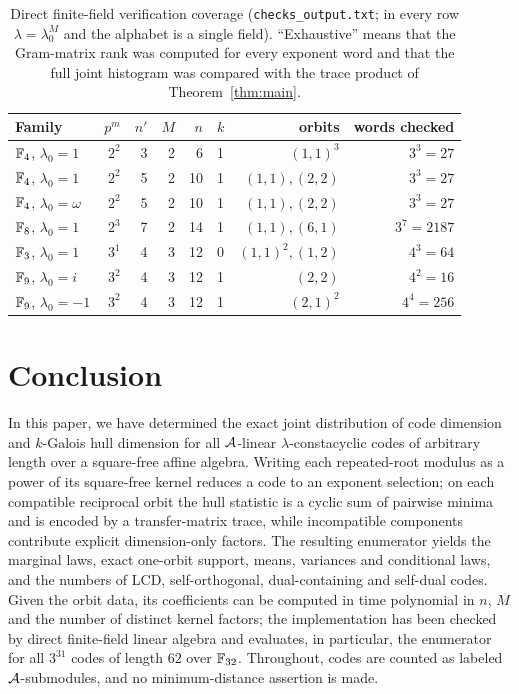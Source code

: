 \begin{table}[!t]
\centering
\scriptsize
\setlength{\tabcolsep}{2.5pt}
\caption{Direct finite-field verification coverage
(\texttt{checks\_output.txt}; in every row $\lambda=\lambda_0^M$ and the
alphabet is a single field).  ``Exhaustive'' means that the Gram-matrix rank
was computed for every exponent word and that the full joint histogram was
compared with the trace product of Theorem~\ref{thm:main}.}
\label{tab:verification}
\begin{tabular}{lrrrrlrr}
\toprule
Family & $p^m$ & $n'$ & $M$ & $n$ & $k$ & orbits & words checked\\
\midrule
$\mathbb F_4$, $\lambda_0=1$ & $2^2$ & 3 & 2 & 6  & 1 & $(1,1)^3$          & $3^3=27$\\
$\mathbb F_4$, $\lambda_0=1$ & $2^2$ & 5 & 2 & 10 & 1 & $(1,1),(2,2)$      & $3^3=27$\\
$\mathbb F_4$, $\lambda_0=\omega$ & $2^2$ & 5 & 2 & 10 & 1 & $(1,1),(2,2)$ & $3^3=27$\\
$\mathbb F_8$, $\lambda_0=1$ & $2^3$ & 7 & 2 & 14 & 1 & $(1,1),(6,1)$      & $3^7=2187$\\
$\mathbb F_3$, $\lambda_0=1$ & $3^1$ & 4 & 3 & 12 & 0 & $(1,1)^2,(1,2)$    & $4^3=64$\\
$\mathbb F_9$, $\lambda_0=i$ & $3^2$ & 4 & 3 & 12 & 1 & $(2,2)$            & $4^2=16$\\
$\mathbb F_9$, $\lambda_0=-1$ & $3^2$ & 4 & 3 & 12 & 1 & $(2,1)^2$         & $4^4=256$\\
\bottomrule
\end{tabular}
\end{table}

\section{Conclusion}\label{sec:conclusions}
In this paper, we have determined the exact joint distribution of code dimension and
$k$-Galois hull dimension for all $\mathcal A$-linear $\lambda$-constacyclic codes
of arbitrary length over a square-free affine algebra. Writing each
repeated-root modulus as a power of its square-free kernel reduces a code to
an exponent selection; on each compatible reciprocal orbit the hull statistic
is a cyclic sum of pairwise minima and is encoded by a transfer-matrix trace,
while incompatible components contribute explicit dimension-only factors. The
resulting enumerator yields the marginal laws, exact one-orbit support,
means, variances and conditional laws, and the numbers of LCD,
self-orthogonal, dual-containing and self-dual codes. Given the orbit data,
its coefficients can be computed in time polynomial in $n$, $M$ and the
number of distinct kernel factors; the implementation has been checked by
direct finite-field linear algebra and evaluates, in particular, the
enumerator for all $3^{31}$ codes of length $62$ over $\mathbb F_{32}$. Throughout,
codes are counted as labeled $\mathcal A$-submodules, and no minimum-distance
assertion is made.

